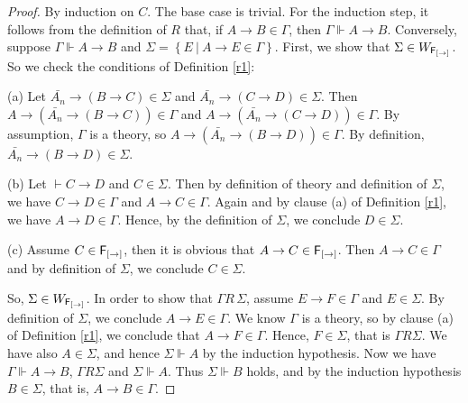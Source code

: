 \documentclass[12pt]{article}
\begin{document}
\begin{proof}


By induction on $C$. The base case is trivial. For the induction step, it follows from the definition of $R$ that, if $A\rightarrow B \in    \Gamma$, then $  \Gamma\Vdash A\rightarrow B $. Conversely, suppose $  \Gamma\Vdash A\rightarrow B $ and  $ \Sigma = \left\lbrace  E ~|~A\rightarrow E \in \Gamma\right\rbrace $. First, we show that $ \Sigma \in W_{{\sf F_{[\rightarrow]}}}$. So we check the conditions of Definition \ref{r1}:

(a) Let $\bar{A_{n}}\rightarrow (B\rightarrow C) \in \Sigma$ and  $\bar{A_{n}}\rightarrow (C\rightarrow D) \in \Sigma$. Then $A\rightarrow (\bar{A_{n}}\rightarrow (B\rightarrow C) )\in \Gamma$ and  $A\rightarrow (\bar{A_{n}}\rightarrow (C\rightarrow D) )\in \Gamma$. By assumption, $ \Gamma $ is a theory, so $A\rightarrow (\bar{A_{n}}\rightarrow (B\rightarrow D) )\in \Gamma$. By definition,  $\bar{A_{n}}\rightarrow (B\rightarrow D) \in \Sigma$.

(b) Let $\vdash C\rightarrow  D$ and $ C \in \Sigma$. Then by definition of theory and  definition of $  \Sigma $, we have $C\rightarrow D \in \Gamma $ and $A\rightarrow C \in \Gamma $. Again and by clause (a) of Definition \ref{r1}, we have $A\rightarrow D \in \Gamma $. Hence,  by the definition of $  \Sigma $, we conclude $ D \in \Sigma$.

(c) Assume $ C\in  {\sf F_{[\rightarrow]}}$, then it is obvious that $ A\rightarrow C\in  {\sf F_{[\rightarrow]}}$. Then $ A\rightarrow C\in  \Gamma$ and by definition of $ \Sigma $, we conclude $ C\in \Sigma$.

 So,  $ \Sigma \in W_{{\sf F_{[\rightarrow]}}}$. In order to show that $  \Gamma R\,  \Sigma $, assume $ E\rightarrow F \in \Gamma $ and $ E \in \Sigma $. By definition of $ \Sigma $, we conclude $ A \rightarrow E \in \Gamma $. We know $ \Gamma $ is a theory, so by clause (a) of Definition \ref{r1}, we conclude that $ A \rightarrow F \in \Gamma $. Hence, $ F \in \Sigma $, that is $  \Gamma R  \Sigma $.
 We have also $ A \in \Sigma$, and hence $ \Sigma \Vdash A$ by the induction hypothesis. Now we have  $  \Gamma\Vdash A\rightarrow B $, $  \Gamma R  \Sigma $ and  $ \Sigma \Vdash A$. Thus  $ \Sigma \Vdash B$ holds, and by the induction hypothesis $ B \in \Sigma $, that is, $A\rightarrow B \in    \Gamma$.
\end{proof}
\end{document}
